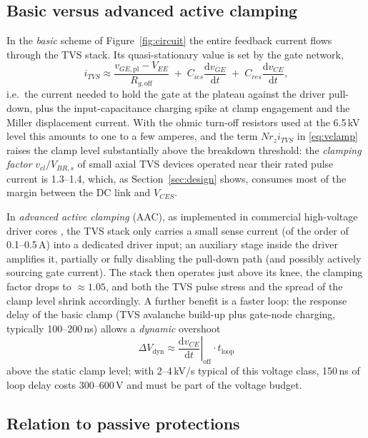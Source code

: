 \documentclass[11pt,a4paper]{article}
\newcommand{\ud}{\mathrm{d}}
\begin{document}
\subsection{Basic versus advanced active clamping}
\label{sec:aac}

In the \emph{basic} scheme of Figure~\ref{fig:circuit} the entire
feedback current flows through the TVS stack. Its quasi-stationary value
is set by the gate network,
%
\begin{equation}
  i_{TVS} \approx
  \frac{v_{GE,\mathrm{pl}} - V_{EE}}{R_{g,\mathrm{off}}}
  \;+\; C_{ies}\frac{\ud v_{GE}}{\ud t}
  \;+\; C_{res}\frac{\ud v_{CE}}{\ud t},
  \label{eq:itvs}
\end{equation}
%
i.e.\ the current needed to hold the gate at the plateau against the
driver pull-down, plus the input-capacitance charging spike at clamp
engagement and the Miller displacement current. With the ohmic
turn-off resistors used at the 6.5\,kV level this amounts to one to a
few amperes, and the term $N r_z i_{TVS}$ in \eqref{eq:vclamp} raises
the clamp level substantially above the breakdown threshold: the
\emph{clamping factor} $v_{cl}/V_{BR,s}$ of small axial TVS devices
operated near their rated pulse current is 1.3--1.4, which, as
Section~\ref{sec:design} shows, consumes most of the margin between the
DC link and $V_{CES}$.

In \emph{advanced active clamping} (AAC), as implemented in commercial
high-voltage driver cores \cite{concept}, the TVS stack only carries a
small sense current (of the order of 0.1--0.5\,A) into a dedicated
driver input; an auxiliary stage inside the driver amplifies it,
partially or fully disabling the pull-down path (and possibly actively
sourcing gate current). The stack then operates just above its knee,
the clamping factor drops to $\approx 1.05$, and both the TVS pulse
stress and the spread of the clamp level shrink accordingly. A further
benefit is a faster loop: the response delay of the basic clamp
(TVS avalanche build-up plus gate-node charging, typically
100--200\,ns) allows a \emph{dynamic} overshoot
%
\begin{equation}
  \Delta V_{\mathrm{dyn}} \approx
  \left.\frac{\ud v_{CE}}{\ud t}\right|_{\mathrm{off}} \cdot t_{\mathrm{loop}}
  \label{eq:dyn}
\end{equation}
%
above the static clamp level; with 2--4\,kV/\textmu s typical of this
voltage class, 150\,ns of loop delay costs 300--600\,V and must be part
of the voltage budget.

\subsection{Relation to passive protections}
\end{document}
